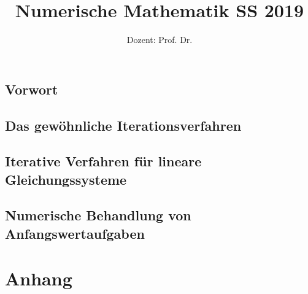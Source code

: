 \documentclass[ngerman,a4paper,order=firstname]{../../texmf/tex/latex/mathscript/mathscript}
\title{\textbf{Numerische Mathematik SS 2019}}
\author{Dozent: Prof. Dr. \person{Andreas Fischer}}
\begin{document}
\pagestyle{plain}

\maketitle

\hypertarget{tocpage}{}
\tableofcontents
{}

\pagebreak
{}
\pagestyle{fancy}

\chapter*{Vorwort}



\chapter{Das gewöhnliche Iterationsverfahren}





\chapter{Iterative Verfahren für lineare Gleichungssysteme}



\chapter{Numerische Behandlung von Anfangswertaufgaben}







\part*{Anhang}
\appendix


\printindex
\end{document}
